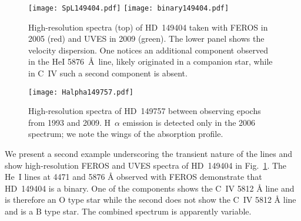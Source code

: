 \documentclass[tradiabstract]{aa} %
\begin{document}
\begin{figure} [h!tb]
  \texttt{[image: SpL149404.pdf]}
  \texttt{[image: binary149404.pdf]}
  \caption{High-resolution spectra (top) of HD~149404 taken with FEROS
    in 2005 (red) and UVES in 2009 (green).  The lower panel shows the
    velocity dispersion. One notices an additional component observed in the
    HeI 5876~\AA\ line, likely originated in a  companion
    star, while in C~IV such a second component is absent.
 \label{HD149404.fig}}
\end{figure}

\begin{figure} [h!tb]
\texttt{[image: Halpha149757.pdf]}
\caption{High-resolution spectra of HD~149757 between observing epochs
  from 1993 and 2009. H~$\alpha$ emission is detected only in the 2006
  spectrum; we note the wings of the absorption profile. \label{Halpha149757.fig}}
\end{figure}




We present a second example{ underscoring} the transient nature of
the lines and show high-resolution FEROS and UVES spectra of HD~149404
in Fig.~\ref{HD149404.fig}.  The He~I { lines} at 4471 and 5876 \AA
\/ observed with FEROS demonstrate that HD~149404 is a binary.  One of
the components shows the C~IV { 5812 \AA} line and is therefore an O
type star while the second does not show the C~IV { 5812 \AA} line
and is a B type star. The combined spectrum is apparently variable.
\end{document}
